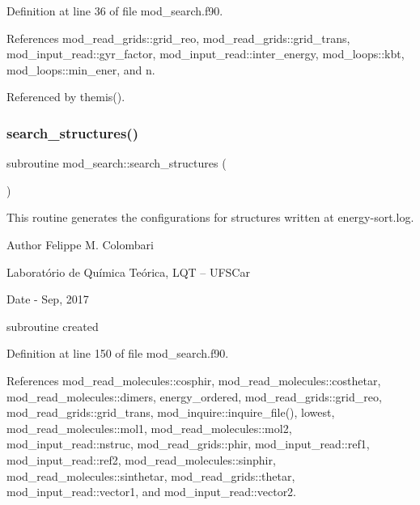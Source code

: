 Definition at line 36 of file mod\+\_\+search.\+f90.



References mod\+\_\+read\+\_\+grids\+::grid\+\_\+reo, mod\+\_\+read\+\_\+grids\+::grid\+\_\+trans, mod\+\_\+input\+\_\+read\+::gyr\+\_\+factor, mod\+\_\+input\+\_\+read\+::inter\+\_\+energy, mod\+\_\+loops\+::kbt, mod\+\_\+loops\+::min\+\_\+ener, and n.



Referenced by themis().

\mbox{\label{namespacemod__search_ac11978e9ebdb6b101a09555f4742a4c9}} 
\subsubsection{\texorpdfstring{search\+\_\+structures()}{search\_structures()}}
{\footnotesize\ttfamily subroutine mod\+\_\+search\+::search\+\_\+structures (\begin{DoxyParamCaption}{ }\end{DoxyParamCaption})}



This routine generates the configurations for structures written at energy-\/sort.\+log. 

\begin{DoxyAuthor}{Author}
Felippe M. Colombari
\begin{DoxyItemize}
\item Laboratório de Química Teórica, L\+QT -- U\+F\+S\+Car 
\end{DoxyItemize}
\end{DoxyAuthor}
\begin{DoxyDate}{Date}
-\/ Sep, 2017
\begin{DoxyItemize}
\item subroutine created 
\end{DoxyItemize}
\end{DoxyDate}


Definition at line 150 of file mod\+\_\+search.\+f90.



References mod\+\_\+read\+\_\+molecules\+::cosphir, mod\+\_\+read\+\_\+molecules\+::costhetar, mod\+\_\+read\+\_\+molecules\+::dimers, energy\+\_\+ordered, mod\+\_\+read\+\_\+grids\+::grid\+\_\+reo, mod\+\_\+read\+\_\+grids\+::grid\+\_\+trans, mod\+\_\+inquire\+::inquire\+\_\+file(), lowest, mod\+\_\+read\+\_\+molecules\+::mol1, mod\+\_\+read\+\_\+molecules\+::mol2, mod\+\_\+input\+\_\+read\+::nstruc, mod\+\_\+read\+\_\+grids\+::phir, mod\+\_\+input\+\_\+read\+::ref1, mod\+\_\+input\+\_\+read\+::ref2, mod\+\_\+read\+\_\+molecules\+::sinphir, mod\+\_\+read\+\_\+molecules\+::sinthetar, mod\+\_\+read\+\_\+grids\+::thetar, mod\+\_\+input\+\_\+read\+::vector1, and mod\+\_\+input\+\_\+read\+::vector2.



